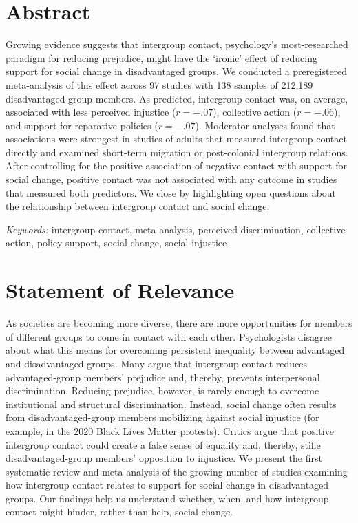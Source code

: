\documentclass[12pt, letterpaper]{article}
\begin{document}
\section{Abstract}

\noindent Growing evidence suggests that intergroup contact, psychology's
most-researched paradigm for reducing prejudice, might have the `ironic'
effect of reducing support for social change in disadvantaged groups. We
conducted a preregistered meta-analysis of this effect across 97 studies
with 138 samples of 212,189 disadvantaged-group members. As predicted,
intergroup contact was, on average, associated with less perceived
injustice (\(r = -.07\)), collective action (\(r = -.06\)), and support
for reparative policies (\(r = -.07\)). Moderator analyses found that
associations were strongest in studies of adults that measured
intergroup contact directly and examined short-term migration or
post-colonial intergroup relations. After controlling for the positive
association of negative contact with support for social change, positive
contact was not associated with any outcome in studies that measured
both predictors. We close by highlighting open questions about the
relationship between intergroup contact and social change.

\textit{Keywords:} intergroup contact, meta-analysis, perceived discrimination, collective
action, policy support, social change, social injustice

\newpage

\section{Statement of Relevance}

\noindent As societies are becoming more diverse, there are more opportunities for
members of different groups to come in contact with each other.
Psychologists disagree about what this means for overcoming persistent
inequality between advantaged and disadvantaged groups. Many argue that
intergroup contact reduces advantaged-group members' prejudice and,
thereby, prevents interpersonal discrimination. Reducing prejudice,
however, is rarely enough to overcome institutional and structural
discrimination. Instead, social change often results from
disadvantaged-group members mobilizing against social injustice (for
example, in the 2020 Black Lives Matter protests). Critics argue that
positive intergroup contact could create a false sense of equality and,
thereby, stifle disadvantaged-group members' opposition to injustice. We
present the first systematic review and meta-analysis of the growing
number of studies examining how intergroup contact relates to support
for social change in disadvantaged groups. Our findings help us
understand whether, when, and how intergroup contact might hinder,
rather than help, social change.
\end{document}
